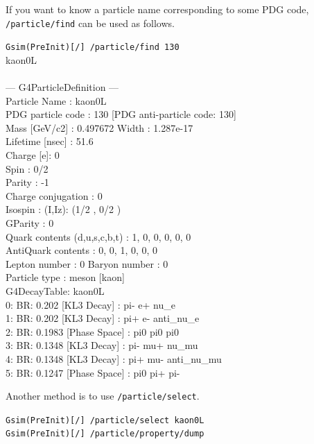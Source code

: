 \documentclass[a4paper,12pt]{article}
\begin{document}
 If you want to know a particle name corresponding to some PDG code,
 {\tt /particle/find} can be used as follows.
 \begin{screen}
  {\tt Gsim(PreInit)[/] /particle/find 130}\\
  {\small
kaon0L\\
\\
--- G4ParticleDefinition ---\\
 Particle Name : kaon0L\\
 PDG particle code : 130 [PDG anti-particle code: 130]\\
 Mass [GeV/c2] : 0.497672     Width : 1.287e-17\\
 Lifetime [nsec] : 51.6\\
 Charge [e]: 0\\
 Spin : 0/2\\
 Parity : -1\\
 Charge conjugation : 0\\
 Isospin : (I,Iz): (1/2 , 0/2 ) \\
 GParity : 0\\
 Quark contents     (d,u,s,c,b,t) : 1, 0, 0, 0, 0, 0\\
 AntiQuark contents               : 0, 0, 1, 0, 0, 0\\
 Lepton number : 0 Baryon number : 0\\
 Particle type : meson [kaon]\\
G4DecayTable:  kaon0L\\
0:  BR:  0.202  [KL3 Decay]   :   pi- e+ nu\_e\\
1:  BR:  0.202  [KL3 Decay]   :   pi+ e- anti\_nu\_e\\
2:  BR:  0.1983  [Phase Space]   :   pi0 pi0 pi0\\
3:  BR:  0.1348  [KL3 Decay]   :   pi- mu+ nu\_mu\\
4:  BR:  0.1348  [KL3 Decay]   :   pi+ mu- anti\_nu\_mu\\
5:  BR:  0.1247  [Phase Space]   :   pi0 pi+ pi-\\
  }
 \end{screen}
 Another method is to use {\tt /particle/select}.
 \begin{screen}
  {\tt Gsim(PreInit)[/] /particle/select kaon0L}\\
  {\tt Gsim(PreInit)[/] /particle/property/dump}
 \end{screen}
\end{document}
